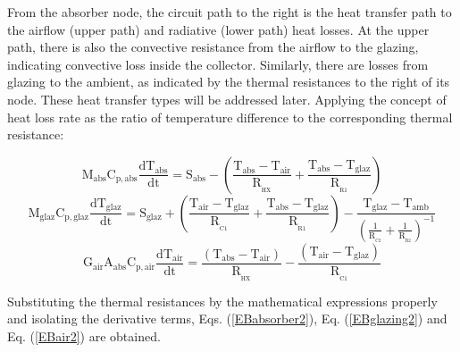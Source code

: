 From the absorber node, the circuit path to the right is the heat transfer path to the airflow (upper path) and radiative (lower path) heat losses. At the upper path, there is also the convective resistance from the airflow to the glazing, indicating convective loss inside the collector. Similarly, there are losses from glazing to the ambient, as indicated by the thermal resistances to the right of its node. These heat transfer types will be addressed later. Applying the concept of heat loss rate as the ratio of temperature difference to the corresponding thermal resistance:

\vspace{-0.75cm}
\begin{equation}
\mathrm{{M_{abs}}{C_{p,abs}}\frac{{d{T_{abs}}}}{{dt}} = {S_{abs}} - \left( {\frac{{{T_{abs}} - {T_{air}}}}{R_{\!_{HX}}} + \frac{{{T_{abs}} - {T_{glaz}}}}{R_{\!_{R1}}}} \right) }
\label{eqabsorber1}
\end{equation}
\vspace*{-0.25cm}
\begin{equation}
\mathrm{{M_{glaz}}{C_{p,glaz}}\frac{{d{T_{glaz}}}}{{dt}} = {S_{glaz}} + \left( {\frac{{{T_{air}} - {T_{glaz}}}}{R_{\!_{C1}}} + \frac{{{T_{abs}} - {T_{glaz}}}}{R_{\!_{R1}}}} \right) - \frac{{{T_{glaz}} - {T_{amb}}}}{{{\displaystyle{\left( {\frac{1}{{{R_{\!_{C2}}}}} + \frac{1}{{{R_{\!_{R2}}}}}} \right)}^{-1}}}}}
\label{eqglazing1}
\end{equation}
\vspace*{-0.25cm}
\begin{equation}
	\mathrm{G_{air}A_{abs}C_{p,air}\frac{dT_{air}}{dt} = \frac{(T_{abs} - T_{air})}{R_{\!_{HX}}} - \frac{(T_{air} - T_{glaz})}{R_{\!_{C1}}}}
	\label{EBair1}
\end{equation}

Substituting the thermal resistances by the mathematical expressions properly and isolating the derivative terms, Eqs. (\ref{EBabsorber2}), Eq. (\ref{EBglazing2}) and Eq. (\ref{EBair2}) are obtained.

